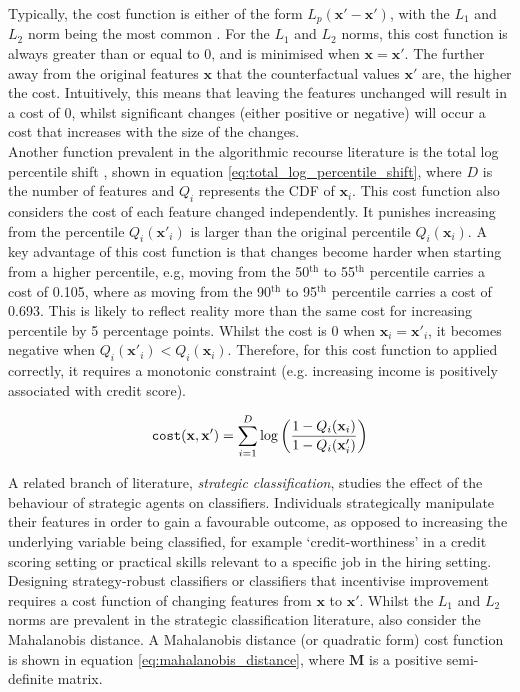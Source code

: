 Typically, the cost function is either of the form $L_p(\mathbf{x}'-\mathbf{x}')$, with the $L_1$ and $L_2$ norm being the most common \citep{ramakrishnanSynthesizingActionSequences2020, karimiSurveyAlgorithmicRecourse2022}. For the $L_1$ and $L_2$ norms, this cost function is always greater than or equal to 0, and is minimised when $\mathbf{x} =\mathbf{x}'$. The further away from the original features $\mathbf{x}$ that the counterfactual values $\mathbf{x}'$ are, the higher the cost. Intuitively, this means that leaving the features unchanged will result in a cost of 0, whilst significant changes (either positive or negative) will occur a cost that increases with the size of the changes.\\

Another function prevalent in the algorithmic recourse literature is the total log percentile shift \citep{ustunActionableRecourseLinear2019}, shown in equation \ref{eq:total_log_percentile_shift}, where $D$ is the number of features and $Q_i$ represents the CDF of $\mathbf{x}_i$. This cost function also considers the cost of each feature changed independently. It punishes increasing from the percentile $Q_i(\mathbf{x}'_i)$ is larger than the original percentile $Q_i(\mathbf{x}_i)$. A key advantage of this cost function is that changes become harder when starting from a higher percentile, e.g, moving from the 50$^{\text{th}}$ to 55$^{\text{th}}$ percentile carries a cost of 0.105, where as moving from the 90$^{\text{th}}$ to 95$^{\text{th}}$ percentile carries a cost of 0.693. This is likely to reflect reality more than the same cost for increasing percentile by 5 percentage points. Whilst the cost is 0 when $\mathbf{x}_i = \mathbf{x}'_i$, it becomes negative when $Q_i(\mathbf{x}'_i) < Q_i(\mathbf{x}_i)$. Therefore, for this cost function to applied correctly, it requires a monotonic constraint (e.g. increasing income is positively associated with credit score).

\begin{equation} \label{eq:total_log_percentile_shift}
	\operatorname*{\texttt{cost}}(\mathbf{x}, \mathbf{x}') = \sum_{i=1}^D \log \bigg( \frac{1 - Q_i(\mathbf{x}_i)}{1 - Q_i(\mathbf{x}_i')} \bigg)
\end{equation}

A related branch of literature, \textit{strategic classification}, studies the effect of the behaviour of strategic agents on classifiers. Individuals strategically manipulate their features in order to gain a favourable outcome, as opposed to increasing the underlying variable being classified, for example `credit-worthiness' in a credit scoring setting or practical skills relevant to a specific job in the hiring setting. Designing strategy-robust classifiers or classifiers that incentivise improvement requires a cost function of changing features from $\mathbf{x}$ to $\mathbf{x}'$. Whilst the  $L_1$ and $L_2$ norms are prevalent in the strategic classification literature, \textcite{bechavodInformationDiscrepancyStrategic2022} also consider the Mahalanobis distance. A Mahalanobis distance (or quadratic form) cost function is shown in equation \ref{eq:mahalanobis_distance}, where $\mathbf{M}$ is a positive semi-definite matrix. 

